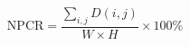 \documentclass[preview,border=4pt]{standalone}
\begin{document}
\begin{equation}
\mathrm{NPCR} = \frac{\sum_{i,j} D(i,j)}{W \times H} \times 100\%
\end{equation}
\end{document}
